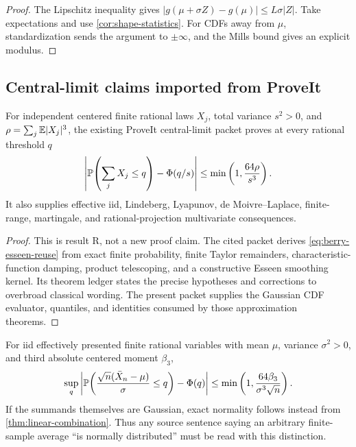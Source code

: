 \begin{proof}
The Lipschitz inequality gives
$|g(\mu+\sigma Z)-g(\mu)|\le L\sigma|Z|$.  Take expectations and use \cref{cor:shape-statistics}.  For CDFs away from $\mu$, standardization sends the argument to $\pm\infty$, and the Mills bound gives an explicit modulus.
\end{proof}

\subsection{Central-limit claims imported from ProveIt}

\begin{theorem}\label{thm:clt-reuse}
For independent centered finite rational laws $X_j$, total variance $s^2>0$, and
$\rho=\sum_j\mathbb E|X_j|^3$, the existing ProveIt central-limit packet proves at every rational threshold $q$
\begin{equation}\label{eq:berry-esseen-reuse}
 \left|\mathbb P\!\left(\sum_jX_j\le q\right)-\Phi(q/s)\right|
 \le\min\left(1,\frac{64\rho}{s^3}
\right).
\end{equation}
It also supplies effective iid, Lindeberg, Lyapunov, de Moivre--Laplace, finite-range, martingale, and rational-projection multivariate consequences.
\end{theorem}

\begin{proof}
This is result R, not a new proof claim.  The cited packet derives \eqref{eq:berry-esseen-reuse} from exact finite probability, finite Taylor remainders, characteristic-function damping, product telescoping, and a constructive Esseen smoothing kernel.  Its theorem ledger states the precise hypotheses and corrections to overbroad classical wording.  The present packet supplies the Gaussian CDF evaluator, quantiles, and identities consumed by those approximation theorems.
\end{proof}

\begin{corollary}\label{cor:sample-mean-clt}
For iid effectively presented finite rational variables with mean $\mu$, variance $\sigma^2>0$, and third absolute centered moment $\beta_3$,
\[
 \sup_q\left|\mathbb P\!\left(
 \frac{\sqrt n(\bar X_n-\mu)}{\sigma}\le q\right)-\Phi(q)\right|
 \le\min\left(1,\frac{64\beta_3}{\sigma^3\sqrt n}
\right).
\]
If the summands themselves are Gaussian, exact normality follows instead from \cref{thm:linear-combination}.  Thus any source sentence saying an arbitrary finite-sample average ``is normally distributed'' must be read with this distinction.
\end{corollary}
